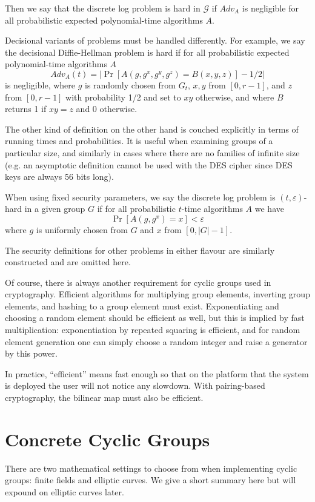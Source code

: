 Then we say that
the discrete log problem is hard in $\mathcal G$ if $Adv_A$ is negligible
for all probabilistic expected polynomial-time algorithms $A$.

Decisional variants of problems must be handled differently.
For example, we say the decisional Diffie-Hellman problem is hard if
for all probabilistic expected polynomial-time algorithms $A$
\[
Adv_A(t) = | \Pr [ A(g, g^x, g^y, g^z) = B(x, y, z) ] - 1/2 |
\]
is negligible,
where $g$ is randomly chosen from $G_t$, $x, y$ from $[0,r-1]$, and
$z$ from $[0,r-1]$ with probability 1/2 and set to $x y$ otherwise,
and where $B$ returns 1 if $x y = z$ and 0 otherwise.

The other kind of definition on the other hand is couched explicitly in
terms of running times and probabilities. It is useful when examining
groups of a particular size, and similarly in cases where there are no
families of infinite size (e.g. an asymptotic definition cannot be used
with the DES cipher since DES keys are always 56 bits long).

When using fixed security parameters, we say the discrete
log problem is $(t, \varepsilon)$-hard in a given
group $G$ if for all probabilistic $t$-time algorithms $A$ we have
\[ \Pr [ A(g, g^x) = x ] < \varepsilon \]
where $g$ is uniformly chosen from $G$ and $x$ from $[0, |G| -1]$.

The security definitions for other problems in either flavour
are similarly constructed and are omitted here.

Of course, there is always another requirement for cyclic groups
used in cryptography.
Efficient algorithms for multiplying group elements, inverting group elements,
and hashing to a group element must exist.
Exponentiating and choosing a random element should be efficient as well,
but this is implied by fast multiplication: exponentiation by
repeated squaring is efficient, and for random element generation
one can simply choose
a random integer and raise a generator by this power.

In practice, ``efficient''
means fast enough so that on the platform that the system is deployed
the user will not notice any slowdown. With pairing-based cryptography,
the bilinear map must also be efficient.

\section{Concrete Cyclic Groups}

There are two mathematical settings to choose from
when implementing cyclic groups: finite fields and elliptic curves.
We give a short summary here but will expound on elliptic curves later.

